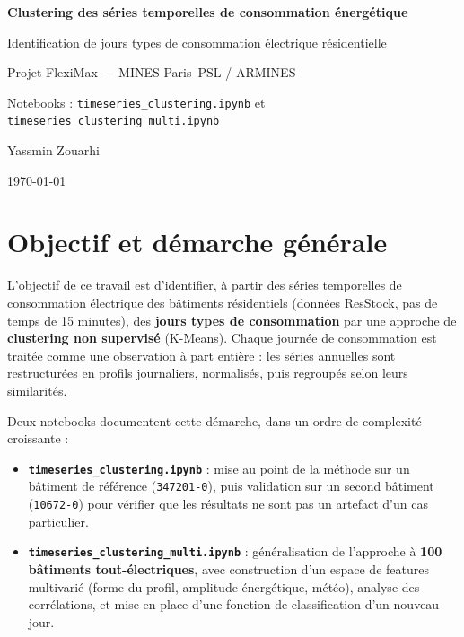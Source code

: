 \documentclass[11pt,a4paper]{article}
\newcommand{\code}[1]{\texttt{#1}}
\begin{document}
\begin{titlepage}
    \centering
    \vspace*{2cm}
    {\LARGE\bfseries\color{headerblue} Clustering des séries temporelles de consommation énergétique\par}
    \vspace{0.5cm}
    {\large Identification de jours types de consommation électrique résidentielle\par}
    \vspace{1.5cm}
    {\large Projet FlexiMax --- MINES Paris--PSL / ARMINES\par}
    \vspace{0.3cm}
    {\normalsize Notebooks : \code{timeseries\_clustering.ipynb} et \code{timeseries\_clustering\_multi.ipynb}\par}
    \vfill
    {\normalsize Yassmin Zouarhi \par}
    {\normalsize \today\par}
\end{titlepage}

\tableofcontents
\newpage

\section{Objectif et démarche générale}

L'objectif de ce travail est d'identifier, à partir des séries temporelles de consommation
électrique des bâtiments résidentiels (données ResStock, pas de temps de 15 minutes), des
\textbf{jours types de consommation} par une approche de \textbf{clustering non supervisé}
(K-Means). Chaque journée de consommation est traitée comme une observation à part entière : les
séries annuelles sont restructurées en profils journaliers, normalisés, puis regroupés selon leurs
similarités.

Deux notebooks documentent cette démarche, dans un ordre de complexité croissante :

\begin{itemize}
    \item \textbf{\code{timeseries\_clustering.ipynb}} : mise au point de la méthode sur un
    bâtiment de référence (\code{347201-0}), puis validation sur un second bâtiment
    (\code{10672-0}) pour vérifier que les résultats ne sont pas un artefact d'un cas particulier.
    \item \textbf{\code{timeseries\_clustering\_multi.ipynb}} : généralisation de l'approche à
    \textbf{100 bâtiments tout-électriques}, avec construction d'un espace de features
    multivarié (forme du profil, amplitude énergétique, météo), analyse des corrélations, et
    mise en place d'une fonction de classification d'un nouveau jour.
\end{itemize}
\end{document}
